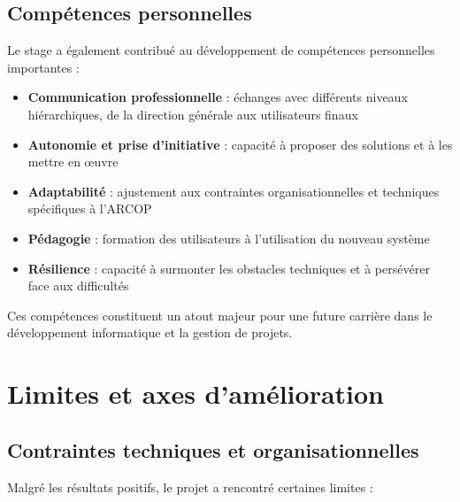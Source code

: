 \subsection{Compétences personnelles}
Le stage a également contribué au développement de compétences personnelles importantes :

\begin{itemize}
    \item \textbf{Communication professionnelle} : échanges avec différents niveaux hiérarchiques, de la direction générale aux utilisateurs finaux
    
    \item \textbf{Autonomie et prise d'initiative} : capacité à proposer des solutions et à les mettre en œuvre
    
    \item \textbf{Adaptabilité} : ajustement aux contraintes organisationnelles et techniques spécifiques à l'ARCOP
    
    \item \textbf{Pédagogie} : formation des utilisateurs à l'utilisation du nouveau système
    
    \item \textbf{Résilience} : capacité à surmonter les obstacles techniques et à persévérer face aux difficultés
\end{itemize}

Ces compétences constituent un atout majeur pour une future carrière dans le développement informatique et la gestion de projets.

\section{Limites et axes d'amélioration}

\subsection{Contraintes techniques et organisationnelles}
Malgré les résultats positifs, le projet a rencontré certaines limites :

